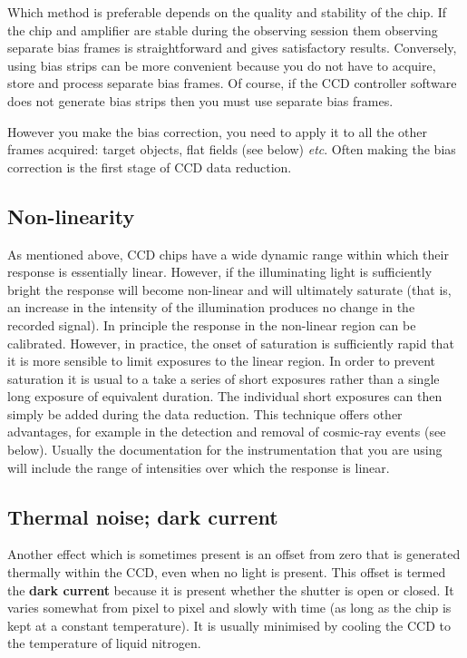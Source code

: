 \documentclass[twoside,11pt]{article}
\begin{document}
Which method is preferable depends on the quality and stability of the
chip.  If the chip and amplifier are stable during the observing session
them observing separate bias frames is straightforward and gives
satisfactory results.  Conversely, using bias strips can be more
convenient because you do not have to acquire, store and process separate
bias frames.  Of course, if the CCD controller software does not generate
bias strips then you must use separate bias frames.

However you make the bias correction, you need to apply it to all the
other frames acquired: target objects, flat fields (see below) \emph{etc}.
Often making the bias correction is the first stage of CCD data reduction.

\subsection{Non-linearity}

As mentioned above, CCD chips have a wide dynamic range within which
their response is essentially linear.  However, if the illuminating
light is sufficiently bright the response will become non-linear and will
ultimately saturate (that is, an increase in the intensity of the
illumination produces no change in the recorded signal).  In principle
the response in the non-linear region can be calibrated.  However, in
practice, the onset of saturation is sufficiently rapid that it is more
sensible to limit exposures to the linear region.  In order to prevent
saturation it is usual to a take a series of short exposures rather than
a single long exposure of equivalent duration.  The individual short
exposures can then simply be added during the data reduction.  This
technique offers other advantages, for example in the detection and removal
of cosmic-ray events (see below).  Usually the documentation for the
instrumentation that you are using will include the range of intensities
over which the response is linear.

\subsection{Thermal noise; dark current}

Another effect which is sometimes present is an offset from zero that is 
generated thermally within the CCD, even when no light is present.  This
offset is termed the {\bf dark current} because it is present whether the
shutter is open or closed.  It varies somewhat from pixel to pixel and
slowly with time (as long as the chip is kept at a constant temperature).
It is usually minimised by cooling the CCD to the temperature of liquid
nitrogen. 
\end{document}
